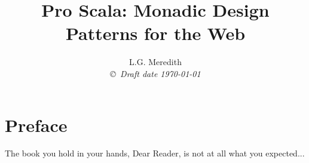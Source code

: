 \documentclass[12pt,leqno]{book}
\title{Pro Scala: Monadic Design Patterns for the Web}
\author{L.G. Meredith  \\
{\small\em \copyright \  Draft date \today }}
\date{ }
\begin{document}
\lstset{language=Haskell}
\maketitle
\tableofcontents
\listoffigures
\listoftables
\chapter*{Preface}\normalsize
\pagestyle{plain}





The book you hold in your hands, Dear Reader, is not at all what you expected...



\pagestyle{headings}














%
\end{document}
